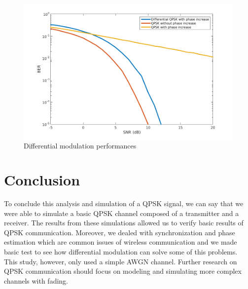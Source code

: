 \documentclass[a4paper,12pt]{article}
\begin{document}
\begin{figure}[ht!]
\centering
\begin{center}
\includegraphics[scale=0.65]{BER_phase_increase2.png}
\caption{Differential modulation performances}
\label{BERphase2}
\end{center}
\end{figure}

\section*{Conclusion}
To conclude this analysis and simulation of a QPSK signal, we can say that we were able to simulate a basic QPSK channel composed of a transmitter and a receiver. The results from these simulations allowed us to verify basic results of QPSK communication. Moreover, we dealed with synchronization and phase estimation which are common issues of wireless communication and we made basic test to see how differential modulation can solve some of this problems.\\

This study, however, only used a simple AWGN channel. Further research on QPSK communication should focus on modeling and simulating more complex channels with fading.

\appendix




\end{document}
